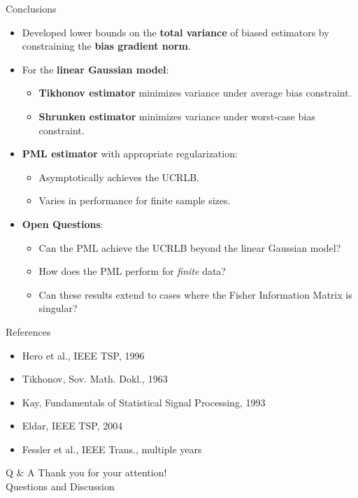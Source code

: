 \documentclass{beamer}
\begin{document}
\begin{frame}{Conclusions}
\begin{itemize}
    \item Developed lower bounds on the \textbf{total variance} of biased estimators by constraining the \textbf{bias gradient norm}.
    \item For the \textbf{linear Gaussian model}:
    \begin{itemize}
        \item \textbf{Tikhonov estimator} minimizes variance under average bias constraint.
        \item \textbf{Shrunken estimator} minimizes variance under worst-case bias constraint.
    \end{itemize}
    \item \textbf{PML estimator} with appropriate regularization:
    \begin{itemize}
        \item Asymptotically achieves the UCRLB.
        \item Varies in performance for finite sample sizes.
    \end{itemize}
    \item \textbf{Open Questions}:
    \begin{itemize}
        \item Can the PML achieve the UCRLB beyond the linear Gaussian model?
        \item How does the PML perform for \textit{finite} data?
        \item Can these results extend to cases where the Fisher Information Matrix is singular?
    \end{itemize}
\end{itemize}
\end{frame}




\begin{frame}{References}
  \scriptsize
  \begin{itemize}
    \item Hero et al., IEEE TSP, 1996
    \item Tikhonov, Sov. Math. Dokl., 1963
    \item Kay, Fundamentals of Statistical Signal Processing, 1993
    \item Eldar, IEEE TSP, 2004
    \item Fessler et al., IEEE Trans., multiple years
  \end{itemize}
\end{frame}

\begin{frame}{Q \& A}
  \centering
  Thank you for your attention! \\
  Questions and Discussion
\end{frame}
\end{document}
